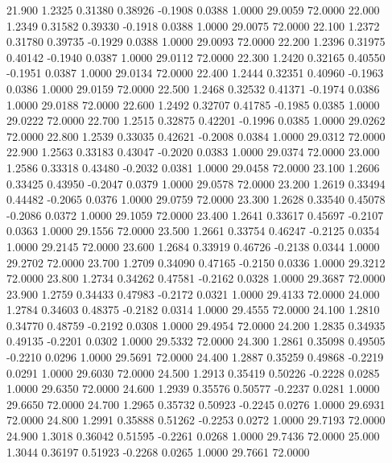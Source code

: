   21.900   1.2325   0.31380   0.38926  -0.1908   0.0388   1.0000  29.0059  72.0000
  22.000   1.2349   0.31582   0.39330  -0.1918   0.0388   1.0000  29.0075  72.0000
  22.100   1.2372   0.31780   0.39735  -0.1929   0.0388   1.0000  29.0093  72.0000
  22.200   1.2396   0.31975   0.40142  -0.1940   0.0387   1.0000  29.0112  72.0000
  22.300   1.2420   0.32165   0.40550  -0.1951   0.0387   1.0000  29.0134  72.0000
  22.400   1.2444   0.32351   0.40960  -0.1963   0.0386   1.0000  29.0159  72.0000
  22.500   1.2468   0.32532   0.41371  -0.1974   0.0386   1.0000  29.0188  72.0000
  22.600   1.2492   0.32707   0.41785  -0.1985   0.0385   1.0000  29.0222  72.0000
  22.700   1.2515   0.32875   0.42201  -0.1996   0.0385   1.0000  29.0262  72.0000
  22.800   1.2539   0.33035   0.42621  -0.2008   0.0384   1.0000  29.0312  72.0000
  22.900   1.2563   0.33183   0.43047  -0.2020   0.0383   1.0000  29.0374  72.0000
  23.000   1.2586   0.33318   0.43480  -0.2032   0.0381   1.0000  29.0458  72.0000
  23.100   1.2606   0.33425   0.43950  -0.2047   0.0379   1.0000  29.0578  72.0000
  23.200   1.2619   0.33494   0.44482  -0.2065   0.0376   1.0000  29.0759  72.0000
  23.300   1.2628   0.33540   0.45078  -0.2086   0.0372   1.0000  29.1059  72.0000
  23.400   1.2641   0.33617   0.45697  -0.2107   0.0363   1.0000  29.1556  72.0000
  23.500   1.2661   0.33754   0.46247  -0.2125   0.0354   1.0000  29.2145  72.0000
  23.600   1.2684   0.33919   0.46726  -0.2138   0.0344   1.0000  29.2702  72.0000
  23.700   1.2709   0.34090   0.47165  -0.2150   0.0336   1.0000  29.3212  72.0000
  23.800   1.2734   0.34262   0.47581  -0.2162   0.0328   1.0000  29.3687  72.0000
  23.900   1.2759   0.34433   0.47983  -0.2172   0.0321   1.0000  29.4133  72.0000
  24.000   1.2784   0.34603   0.48375  -0.2182   0.0314   1.0000  29.4555  72.0000
  24.100   1.2810   0.34770   0.48759  -0.2192   0.0308   1.0000  29.4954  72.0000
  24.200   1.2835   0.34935   0.49135  -0.2201   0.0302   1.0000  29.5332  72.0000
  24.300   1.2861   0.35098   0.49505  -0.2210   0.0296   1.0000  29.5691  72.0000
  24.400   1.2887   0.35259   0.49868  -0.2219   0.0291   1.0000  29.6030  72.0000
  24.500   1.2913   0.35419   0.50226  -0.2228   0.0285   1.0000  29.6350  72.0000
  24.600   1.2939   0.35576   0.50577  -0.2237   0.0281   1.0000  29.6650  72.0000
  24.700   1.2965   0.35732   0.50923  -0.2245   0.0276   1.0000  29.6931  72.0000
  24.800   1.2991   0.35888   0.51262  -0.2253   0.0272   1.0000  29.7193  72.0000
  24.900   1.3018   0.36042   0.51595  -0.2261   0.0268   1.0000  29.7436  72.0000
  25.000   1.3044   0.36197   0.51923  -0.2268   0.0265   1.0000  29.7661  72.0000
